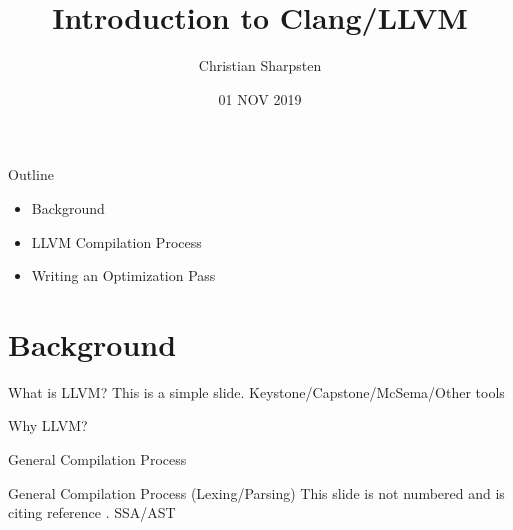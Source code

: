 \documentclass{beamer}
\title{Introduction to Clang/LLVM}
\author{Christian Sharpsten}
\institute{\todo{\\ Institute Name \\ Institute Address}}
\date{01 NOV 2019}
\begin{document}

\begin{frame}
    \maketitle %
\end{frame}

\begin{frame}{Outline}
    \begin{itemize}
        \item Background
        \item LLVM Compilation Process
        \item Writing an Optimization Pass
    \end{itemize}
\end{frame}


\section{Background} %


\begin{frame}{What is LLVM?}
    This is a simple slide.
    Keystone/Capstone/McSema/Other tools
\end{frame}


\begin{frame}{Why LLVM?}

\end{frame}


\begin{frame}{General Compilation Process}

\end{frame}


\begin{frame}{General Compilation Process (Lexing/Parsing)}
    This slide is not numbered and is citing reference \cite{knuth74}.
    SSA/AST
\end{frame}
\end{document}
